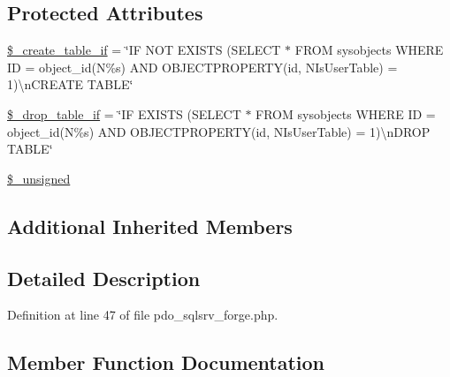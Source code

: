 \subsection*{Protected Attributes}
\begin{DoxyCompactItemize}
\item 
\mbox{\hyperlink{class_c_i___d_b__pdo__sqlsrv__forge_a2f6484fcb8d1dc3eef67a637227cd583}{\$\+\_\+create\+\_\+table\+\_\+if}} = \char`\"{}IF N\+OT E\+X\+I\+S\+TS (S\+E\+L\+E\+CT $\ast$ F\+R\+OM sysobjects W\+H\+E\+RE ID = object\+\_\+id(N\textquotesingle{}\%s\textquotesingle{}) A\+ND O\+B\+J\+E\+C\+T\+P\+R\+O\+P\+E\+R\+TY(id, N\textquotesingle{}Is\+User\+Table\textquotesingle{}) = 1)\textbackslash{}n\+C\+R\+E\+A\+TE T\+A\+B\+LE\char`\"{}
\item 
\mbox{\hyperlink{class_c_i___d_b__pdo__sqlsrv__forge_a92a8a9145a7fc91e252e58d019373581}{\$\+\_\+drop\+\_\+table\+\_\+if}} = \char`\"{}IF E\+X\+I\+S\+TS (S\+E\+L\+E\+CT $\ast$ F\+R\+OM sysobjects W\+H\+E\+RE ID = object\+\_\+id(N\textquotesingle{}\%s\textquotesingle{}) A\+ND O\+B\+J\+E\+C\+T\+P\+R\+O\+P\+E\+R\+TY(id, N\textquotesingle{}Is\+User\+Table\textquotesingle{}) = 1)\textbackslash{}n\+D\+R\+OP T\+A\+B\+LE\char`\"{}
\item 
\mbox{\hyperlink{class_c_i___d_b__pdo__sqlsrv__forge_aae977ae6d61fa183f0b25422b6ddc31c}{\$\+\_\+unsigned}}
\end{DoxyCompactItemize}
\subsection*{Additional Inherited Members}


\subsection{Detailed Description}


Definition at line 47 of file pdo\+\_\+sqlsrv\+\_\+forge.\+php.



\subsection{Member Function Documentation}
\mbox{\label{class_c_i___d_b__pdo__sqlsrv__forge_a41c6cae02f2fda8b429ad0afb9509426}} 
